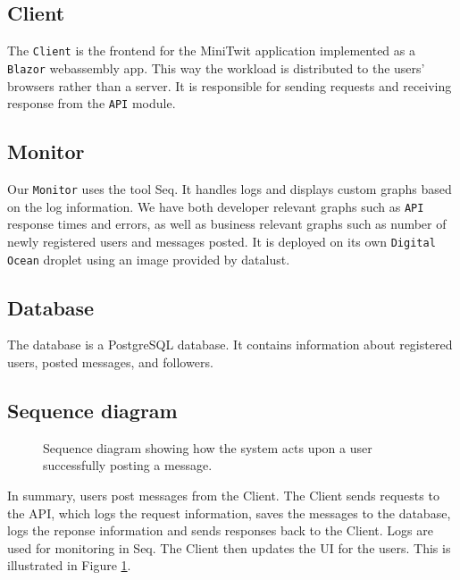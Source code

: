 \subsection{Client}

The \texttt{Client} is the frontend for the MiniTwit application implemented as a \texttt{Blazor} webassembly app. This way the workload is distributed to the users' browsers rather than a server. It is responsible for sending requests and receiving response from the \texttt{API} module.

\subsection{Monitor}

Our \texttt{Monitor} uses the tool Seq\cite{seq}.
It handles logs and displays custom graphs based on 
the log information. We have both developer relevant 
graphs such as \texttt{API} response times and errors,
as well as business relevant graphs such as number 
of newly registered users and messages posted.
It is deployed on its own \texttt{Digital Ocean} droplet 
using an image provided by datalust\cite{seq}.

\subsection{Database}

The database is a PostgreSQL\cite{postgres} database.
It contains information about registered users,
posted messages, and followers.

\subsection{Sequence diagram}

\begin{figure}[H]
    \centering
    \caption{Sequence diagram showing how the system acts upon 
    a user successfully posting a message.}
    \label{fig:seq_diagram}
\end{figure}

In summary, users post messages from the Client.
The Client sends requests to the API, which logs the request 
information, saves the messages to the database, 
logs the reponse information and sends responses back to the 
Client. Logs are used for monitoring in Seq. 
The Client then updates the UI for the users.
This is illustrated in Figure \ref{fig:seq_diagram}.
